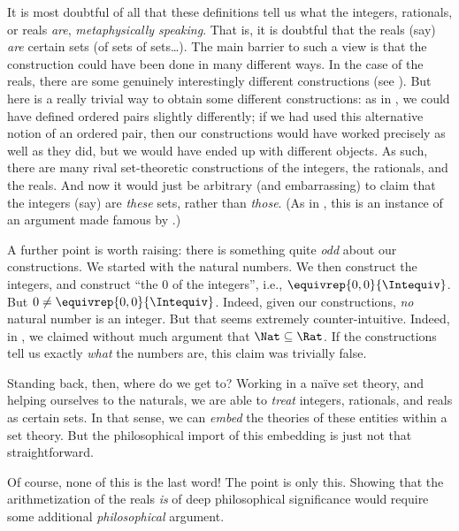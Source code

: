 \documentclass[../../../include/open-logic-section]{subfiles}
\begin{document}
It is most doubtful of all that these definitions tell us what the
integers, rationals, or reals \emph{are}, \emph{metaphysically
speaking}. That is, it is doubtful that the reals (say) \emph{are}
certain sets (of sets of sets\ldots). The main barrier to such a view
is that the construction could have been done in many different ways.
In the case of the reals, there are some genuinely interestingly
different constructions (see ). But here is a
really trivial way to obtain some different constructions: as in
, we could have defined ordered pairs
slightly differently; if we had used this alternative notion of an
ordered pair, then our constructions would have worked precisely as
well as they did, but we would have ended up with different objects.
As such, there are many rival set-theoretic constructions of the
integers, the rationals, and the reals. And now it would just be
arbitrary (and embarrassing) to claim that the integers (say) are
\emph{these} sets, rather than \emph{those}. (As in
, this is an instance of an argument made
famous by \citealt{Benacerraf1965}.)

A further point is worth raising: there is something quite \emph{odd}
about our constructions. We started with the natural numbers. We then
construct the integers, and construct ``the $0$ of the integers'',
i.e., $ \equivrep{0,0}{\Intequiv}$. But $0 \neq
\equivrep{0,0}{\Intequiv}$. Indeed,  given our constructions,
\emph{no} natural number is an integer. But that seems extremely
counter-intuitive. Indeed, in , we claimed
without much argument that $\Nat \subseteq \Rat$. If the constructions
tell us exactly \emph{what} the numbers are, this claim was trivially
false. 

Standing back, then, where do we get to? Working in a na\"ive set
theory, and helping ourselves to the naturals, we are able to
\emph{treat} integers, rationals, and reals as certain sets. In that
sense, we can \emph{embed} the theories of these entities within a set
theory. But the philosophical import of this embedding is just not
that straightforward. 

Of course, none of this is the last word!{} The point is only this.
Showing that the arithmetization of the reals \emph{is} of deep
philosophical significance would require some additional
\emph{philosophical} argument.

\end{document}
